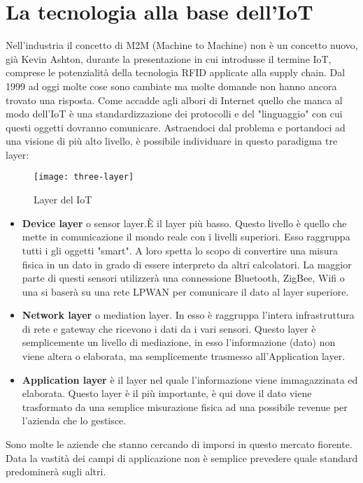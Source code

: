 \section{La tecnologia alla base dell'IoT} 
Nell'industria il concetto di M2M (Machine to Machine) non è un concetto
nuovo,
già Kevin Ashton, durante la presentazione in cui introdusse il termine IoT,
comprese le potenzialità della tecnologia RFID applicate alla supply chain. Dal
1999 ad oggi molte cose sono cambiate ma molte domande non hanno ancora trovato
una risposta. Come accadde agli albori di Internet quello che manca al modo
dell'IoT è una standardizzazione dei protocolli e del "linguaggio" con cui questi
oggetti dovranno comunicare. Astraendoci dal problema e portandoci ad una visione
di più alto livello, è possibile individuare in questo paradigma
tre layer:
\begin{figure}[ht]
        \centering 
                \texttt{[image: three-layer]}
        \caption{Layer del IoT}
\end{figure}
\begin{itemize}
\item   \textbf{Device layer} o sensor layer.È il layer più basso. Questo 
        livello è quello che mette in comunicazione il
        mondo reale con i livelli superiori. Esso raggruppa
        tutti i gli oggetti "smart".  A loro spetta lo scopo di convertire
        una misura fisica in un dato in grado di essere  interpreto da altri calcolatori.
        La maggior parte di questi sensori utilizzerà una connessione Bluetooth,
        ZigBee, Wifi o una si baserà su una rete LPWAN per comunicare il dato al layer
        superiore.
\item \textbf{Network layer} o mediation layer. In esso è raggruppa l'intera infrastruttura
di rete e gateway che ricevono i dati da i vari sensori. Questo layer è
semplicemente un livello di mediazione, in esso l'informazione (dato) non viene
altera o elaborata, ma semplicemente trasmesso all'Application layer.
\item \textbf{Application layer} è il layer nel quale l'informazione viene
immagazzinata ed elaborata. Questo layer è il più importante, è qui dove il dato
viene trasformato da una semplice misurazione fisica ad una possibile revenue
per l'azienda che lo gestisce.%
\end{itemize}
Sono molte le aziende che stanno cercando di imporsi in questo
mercato fiorente. Data la vastità dei campi di applicazione non è semplice
prevedere quale standard predominerà sugli altri.
